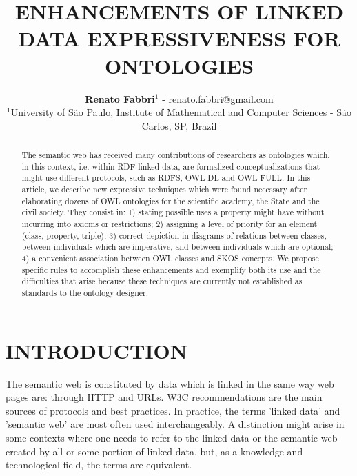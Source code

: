 \documentclass[12pt,fleqn]{article}
\title{ENHANCEMENTS OF LINKED DATA EXPRESSIVENESS FOR ONTOLOGIES}
\author
    {\rm \begin{tabular}{l} 
    \textbf{Renato Fabbri}$^{1}$ - {\textnormal renato.fabbri@gmail.com}\\%
    {\fontsize{11}{0}\selectfont $^{1}$University of São Paulo, Institute of Mathematical and Computer Sciences - São Carlos, SP, Brazil}\vspace*{-0.05cm} \\
  \end{tabular}}
\renewcommand{\headrulewidth}{0.0pt}
\begin{document}
\maketitle

\thispagestyle{firspagetstyle}

\renewcommand{\headrulewidth}{0.0pt}
\rhead{}

\begin{abstract}
	The semantic web has received many contributions of researchers as ontologies which,
	in this context, i.e. within RDF linked data, are formalized conceptualizations that might use
	different protocols, such as RDFS, OWL DL and OWL FULL.
	In this article, we describe new expressive techniques which were found necessary after
	elaborating dozens of OWL ontologies for the scientific academy, the State and the civil society.
	They consist in: 1) stating possible uses a property might have without incurring into axioms or restrictions;
	2) assigning a level of priority for an element (class, property, triple); 3) correct depiction in diagrams
	of relations between classes, between individuals which are imperative, and between individuals which are optional;
	4) a convenient association between OWL classes and SKOS concepts.
	We propose specific rules to accomplish these enhancements and exemplify both its use
	and the difficulties that arise because these techniques are currently not established as standards to the ontology designer.  
\end{abstract}


\pagestyle{fancy}

\section{INTRODUCTION}
The semantic web is constituted by data which is linked in the same way
web pages are: through HTTP and URLs.
W3C recommendations are the main sources of protocols and best practices.
In practice, the terms 'linked data' and 'semantic web' are most often used interchangeably.
A distinction might arise in some contexts where one needs to refer to the linked data or
the semantic web created by all or some portion of linked data, but, as a knowledge and technological
field, the terms are equivalent.
\end{document}
